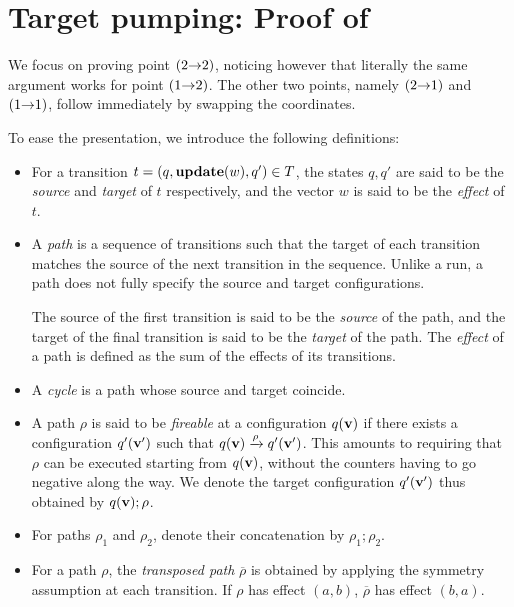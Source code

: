 \section{Target pumping: Proof of }\label{sec:targetpump}
%

We focus on proving point $({2}{\rightarrow}{2})$, noticing however that
literally the same argument 
works for point $({1}{\rightarrow}{2})$.
The other two points, namely $({2}{\rightarrow}{1})$ and $({1}{\rightarrow}{1})$,
follow immediately by swapping the coordinates.

To ease the presentation, we introduce the following definitions:
\begin{itemize}
\item For a transition $t = (q, \textbf{update}(w), q') \in T$, the states $q, q'$
    are said to be the \emph{source} and \emph{target} of $t$ respectively,
    and the vector $w$ is said to be the \emph{effect} of $t$.
\item A \emph{path} is a sequence of transitions such that the target
    of each transition matches the source of the next transition
    in the sequence. Unlike a run, a path does not fully specify
    the source and target configurations.

    The source of the first transition is said to be the \emph{source} of the path,
    and the target of the final transition is said to be the \emph{target} of the
    path. The \emph{effect} of a path is defined as the sum of the effects of its
    transitions.
\item A \emph{cycle} is a path whose source and target coincide.
\item A path $\rho$ is said to be \emph{fireable} at a configuration $q(\mathbf{v})$
    if there exists a configuration $q'(\mathbf{v}')$ such that $q(\mathbf{v}) \xrightarrow{\rho} q'(\mathbf{v}')$.
    This amounts to requiring that $\rho$ can be executed starting from $q(\mathbf{v})$,
    without the counters having to go negative along the way.
    We denote the target configuration $q'(\mathbf{v}')$ thus obtained by $q(\mathbf{v}); \rho$.
\item For paths $\rho_1$ and $\rho_2$, denote their concatenation by $\rho_1; \rho_2$.
\item For a path $\rho$, the \emph{transposed path} $\overline{\rho}$ is obtained
    by applying the symmetry assumption at each transition.
    If $\rho$ has effect $(a, b)$, $\overline{\rho}$ has effect $(b, a)$.
\end{itemize}

